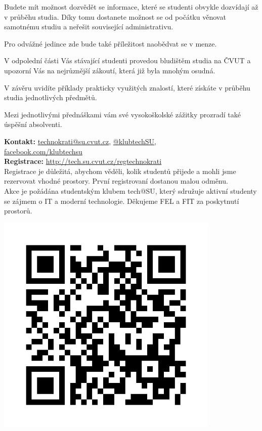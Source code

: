 \documentclass[12pt]{extarticle}[10.3.2013]
\makeatletter
\newcommand{\B}[1]{\textbf{{#1}}}
\newcommand{\techSU}{tech@SU}
\makeatother
\begin{document}
Budete mít možnost dozvědět se informace, které se studenti obvykle
dozvídají až v průběhu studia. Díky tomu dostanete možnost se od
počátku věnovat samotnému studiu a neřešit související administrativu.


Pro odvážné jedince zde bude také příležitost naobědvat se v menze.

V odpolední části Vás stávající studenti provedou bludištěm studia na
ČVUT a upozorní Vás na nejrůznější zákoutí, která již byla mnohým osudná.

V závěru uvidíte příklady prakticky využitých znalostí, které získáte v
průběhu studia jednotlivých předmětů.

Mezi jednotlivými přednáškami vám své vysokoškolské zážitky prozradí
také úspěšní absolventi.

\vspace{3em}

\begin{minipage}[c]{0.5\textwidth}
\B{Kontakt:} \href{mailto:technokrati@su.cvut.cz}{technokrati@su.cvut.cz}, \href{https://twitter.com/klubtechsu}{@klubtechSU}, \\ \href{https://facebook.com/klubtechsu}{facebook.com/klubtechsu} \\

\B{Registrace:} \href{http://tech.su.cvut.cz/regtechnokrati}{http://tech.su.cvut.cz/regtechnokrati} \\
Registrace je důležitá, abychom věděli, kolik studentů přijede a mohli jsme rezervovat vhodné prostory. První registrovaní dostanou malou odměnu. \\

Akce je požádána studentským klubem \techSU, který sdružuje aktivní studenty se zájmem o IT a moderní technologie. Děkujeme FEL a FIT za poskytnutí prostorů.
\end{minipage}
\begin{minipage}[c]{0.5\textwidth}
\begin{center}
	{\includegraphics[width=0.8\textwidth]{reg-odkaz.png}}
\end{center}
\end{minipage}
\end{document}
